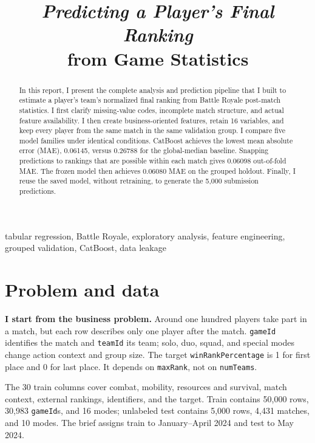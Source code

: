 \documentclass[10pt,conference]{IEEEtran}
\title{\textit{Predicting a Player's Final Ranking}\\
\large from Game Statistics}
\author{
\IEEEauthorblockN{\textbf{Rostand Surel}}
\IEEEauthorblockA{\textit{Data Scientist} --- Paris, France\\[0.3em]
\href{tel:0753356106}{\faPhone\ 075-335-6106}\contactsep
\href{mailto:rostandsurel@yahoo.com}{\faEnvelope\ rostandsurel@yahoo.com}\contactsep
\href{https://linkedin.com/in/rostand-surel}{\faLinkedin\ linkedin.com/in/rostand-surel}\\
\href{https://github.com/Manda404}{\faGithub\ github.com/Manda404}\contactsep
\href{https://Manda404.github.io}{\faGlobe\ Portfolio}\contactsep
\faMapMarker*\ Paris, France}
}
\newcommand{\code}[1]{\texttt{\small #1}}
\begin{document}
\maketitle

\begin{abstract}
In this report, I present the complete analysis and prediction pipeline that I
built to estimate a player's team's normalized final ranking from Battle Royale
post-match statistics. I first clarify missing-value codes, incomplete match
structure, and actual feature availability. I then create business-oriented
features, retain 16 variables, and keep every player from the same match in the
same validation group. I compare five model families under identical
conditions. CatBoost achieves the lowest mean absolute error (MAE), 0.06145,
versus 0.26788 for the global-median baseline. Snapping predictions to rankings
that are possible within each match gives 0.06098 out-of-fold MAE. The frozen
model then achieves 0.06080 MAE on the grouped holdout. Finally, I reuse the
saved model, without retraining, to generate the 5,000 submission predictions.
\end{abstract}

\begin{IEEEkeywords}
tabular regression, Battle Royale, exploratory analysis, feature engineering,
grouped validation, CatBoost, data leakage
\end{IEEEkeywords}

\section{Problem and data}

\textbf{I start from the business problem.} Around one hundred players take
part in a match, but each row describes only one player after the match.
\code{gameId} identifies the match and \code{teamId} its team; solo, duo,
squad, and special modes change action context and group size. The target
\code{winRankPercentage} is 1 for first place and 0 for last place. It depends
on \code{maxRank}, not on \code{numTeams}.

The 30 train columns cover combat, mobility, resources and survival, match
context, external rankings, identifiers, and the target. Train contains 50,000
rows, 30,983 \code{gameId}s, and 16 modes; unlabeled test contains 5,000 rows,
4,431 matches, and 10 modes. The brief assigns train to January--April 2024
and test to May 2024.
\end{document}
